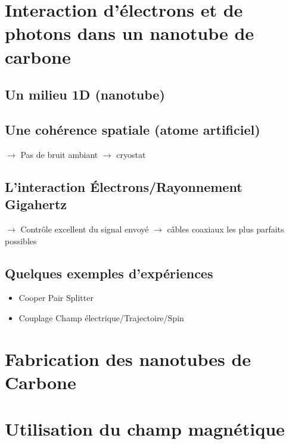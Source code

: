 

\section{Interaction d'électrons et de photons dans un nanotube de carbone}
\subsection{Un milieu 1D (nanotube)}

\subsection{Une cohérence spatiale (atome artificiel)}
$\rightarrow$ Pas de bruit ambiant $\rightarrow$ cryostat

\subsection{L'interaction Électrons/Rayonnement Gigahertz}
$\rightarrow$ Contrôle excellent du signal envoyé $\rightarrow$ câbles coaxiaux les plus parfaits possibles

\subsection{Quelques exemples d'expériences}
\begin{itemize}
    \item Cooper Pair Splitter
    \item Couplage Champ électrique/Trajectoire/Spin
\end{itemize}

\section{Fabrication des nanotubes de Carbone}

\section{Utilisation du champ magnétique}
